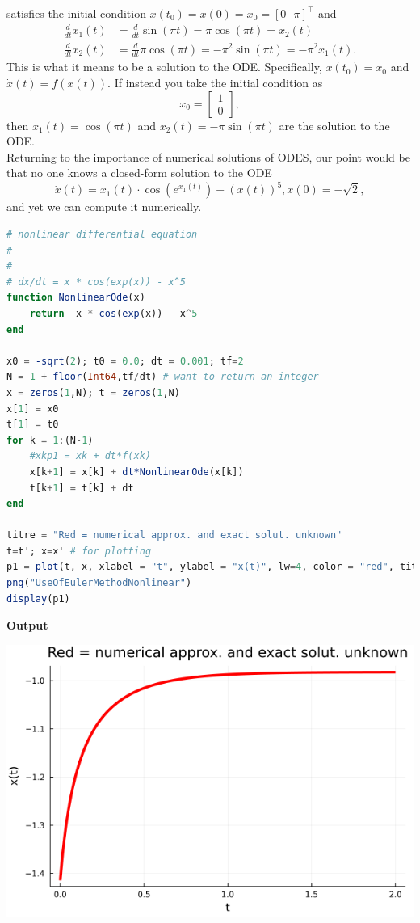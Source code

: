 satisfies the initial condition $x(t_0)=x(0) = x_0 = \left[0~~~\pi\right]^\top$  and 
\begin{align*}
    \frac{d}{dt}x_1(t) & = \frac{d}{dt}\sin(\pi t)= \pi \cos(\pi t) = x_2(t)\\
     \frac{d}{dt}x_2(t) & = \frac{d}{dt}\pi \cos(\pi t)= -\pi^2 \sin(\pi t) = -\pi^2 x_1(t).
\end{align*}
This is what it means to be a solution to the ODE. Specifically, $x(t_0) = x_0$ and $\dot{x}(t) = f(x(t))$. If instead you take the initial condition as 
$$ x_0 = \begin{bmatrix} 1 \\ 0 \end{bmatrix},
$$
then $x_1(t) = \cos(\pi t)$ and $x_2(t) = -\pi \sin(\pi t)$
are the solution to the ODE. \\

Returning to the importance of numerical solutions of ODES, our point would be that no one knows a closed-form solution to the ODE $$ \dot{x}(t) = x_1(t) \cdot \cos(e^{x_1(t)}) - (x(t))^5, x(0)=-\sqrt{2},$$ and yet we can compute it numerically. \\


\begin{lstlisting}[language=Julia,style=mystyle]
# nonlinear differential equation
# 
#
# dx/dt = x * cos(exp(x)) - x^5
function NonlinearOde(x)
    return  x * cos(exp(x)) - x^5
end

x0 = -sqrt(2); t0 = 0.0; dt = 0.001; tf=2
N = 1 + floor(Int64,tf/dt) # want to return an integer
x = zeros(1,N); t = zeros(1,N)
x[1] = x0
t[1] = t0
for k = 1:(N-1)
    #xkp1 = xk + dt*f(xk)
    x[k+1] = x[k] + dt*NonlinearOde(x[k])
    t[k+1] = t[k] + dt
end

titre = "Red = numerical approx. and exact solut. unknown"
t=t'; x=x' # for plotting
p1 = plot(t, x, xlabel = "t", ylabel = "x(t)", lw=4, color = "red", title = titre, legend = false)
png("UseOfEulerMethodNonlinear")
display(p1)
\end{lstlisting}
\textbf{Output} 
\begin{center}
\includegraphics[width=0.6\columnwidth]{graphics/Chap09/UseOfEulerMethodNonlinear.png}
\end{center}

